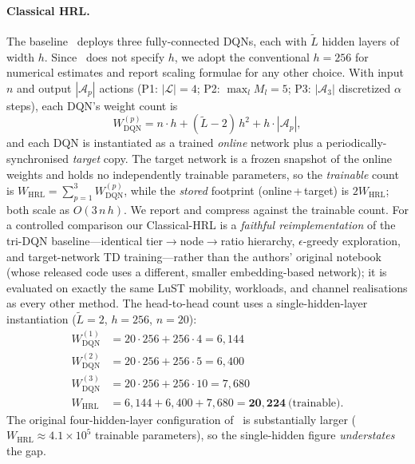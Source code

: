 \documentclass[11pt,a4paper]{article}
\theoremstyle{definition}
\begin{document}
\paragraph{Classical HRL.}
The baseline~\cite{hrl_ntn} deploys three fully-connected DQNs, each with $\tilde{L}$ hidden layers of width $h$. Since~\cite{hrl_ntn} does not specify $h$, we adopt the conventional $h{=}256$ for numerical estimates and report scaling formulae for any other choice. With input $n$ and output $|\mathcal{A}_p|$ actions (P1: $|\mathcal{L}|{=}4$; P2: $\max_l M_l{=}5$; P3: $|\mathcal{A}_3|$ discretized $\alpha$ steps), each DQN's weight count is
\begin{equation}
  W_{\mathrm{DQN}}^{(p)} = n \cdot h
  + (\tilde{L}-2)\,h^2
  + h \cdot |\mathcal{A}_p|,
  \label{eq:dqn_params}
\end{equation}
and each DQN is instantiated as a trained \emph{online} network plus a periodically-synchronised \emph{target} copy. The target network is a frozen snapshot of the online weights and holds no independently trainable parameters, so the \emph{trainable} count is $W_{\mathrm{HRL}}=\sum_{p=1}^{3} W_{\mathrm{DQN}}^{(p)}$, while the \emph{stored} footprint (online\,+\,target) is $2W_{\mathrm{HRL}}$; both scale as $O(3\,n\,h)$. We report and compress against the trainable count. For a controlled comparison our Classical-HRL is a \emph{faithful reimplementation} of the tri-DQN baseline---identical tier$\to$node$\to$ratio hierarchy, $\epsilon$-greedy exploration, and target-network TD training---rather than the authors' original notebook (whose released code uses a different, smaller embedding-based network); it is evaluated on exactly the same LuST mobility, workloads, and channel realisations as every other method. The head-to-head count uses a single-hidden-layer instantiation ($\tilde{L}{=}2$, $h{=}256$, $n{=}20$):
\begin{align}
  W_{\mathrm{DQN}}^{(1)} &= 20 \cdot 256 + 256 \cdot 4  = 6{,}144 \nonumber\\
  W_{\mathrm{DQN}}^{(2)} &= 20 \cdot 256 + 256 \cdot 5  = 6{,}400 \nonumber\\
  W_{\mathrm{DQN}}^{(3)} &= 20 \cdot 256 + 256 \cdot 10 = 7{,}680 \nonumber\\
  W_{\mathrm{HRL}} &= 6{,}144 + 6{,}400 + 7{,}680 = \mathbf{20{,}224}\ \text{(trainable)}.
  \label{eq:hrl_total}
\end{align}
The original four-hidden-layer configuration of~\cite[Sec.~IV-A]{hrl_ntn} is substantially larger ($W_{\mathrm{HRL}}\!\approx\!4.1\times10^{5}$ trainable parameters), so the single-hidden figure \emph{understates} the gap.
\end{document}
